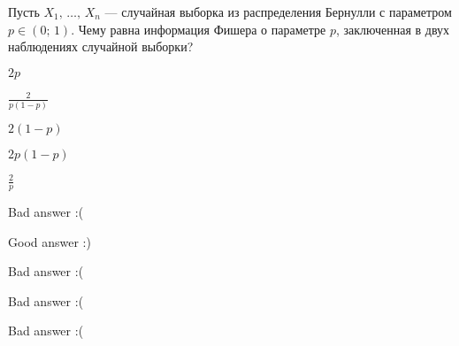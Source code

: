 
\begin{question}
Пусть \(X_1, \, \ldots, \, X_n\) --- случайная выборка из распределения
Бернулли с параметром \(p \in (0;\,1)\). Чему равна информация Фишера о
параметре \(p\), заключенная в двух наблюдениях случайной выборки?
\begin{answerlist}
  \item \(2p\)
  \item \(\tfrac{2}{p(1-p)}\)
  \item \(2(1 - p)\)
  \item \(2p(1-p)\)
  \item \(\tfrac{2}{p}\)
\end{answerlist}
\end{question}

\begin{solution}
\begin{answerlist}
  \item Bad answer :(
  \item Good answer :)
  \item Bad answer :(
  \item Bad answer :(
  \item Bad answer :(
\end{answerlist}
\end{solution}

